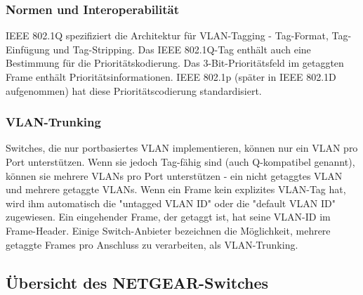         \subsubsection{Normen und Interoperabilität}
        IEEE 802.1Q spezifiziert die Architektur für VLAN-Tagging - Tag-Format, Tag-Einfügung und Tag-Stripping. Das IEEE 802.1Q-Tag enthält auch eine Bestimmung für die Prioritätskodierung. Das 3-Bit-Prioritätsfeld im getaggten Frame enthält Prioritätsinformationen. IEEE 802.1p (später in IEEE 802.1D aufgenommen) hat diese Prioritätscodierung standardisiert.

        \subsubsection{VLAN-Trunking}
        Switches, die nur portbasiertes VLAN implementieren, können nur ein VLAN pro Port unterstützen. Wenn sie jedoch Tag-fähig sind (auch Q-kompatibel genannt), können sie mehrere VLANs pro Port unterstützen - ein nicht getaggtes VLAN und mehrere getaggte VLANs. Wenn ein Frame kein explizites VLAN-Tag hat, wird ihm automatisch die "untagged VLAN ID" oder die "default VLAN ID" zugewiesen. Ein eingehender Frame, der getaggt ist, hat seine VLAN-ID im Frame-Header. Einige Switch-Anbieter bezeichnen die Möglichkeit, mehrere getaggte Frames pro Anschluss zu verarbeiten, als VLAN-Trunking.

    \newpage
    \subsection{Übersicht des NETGEAR-Switches}

